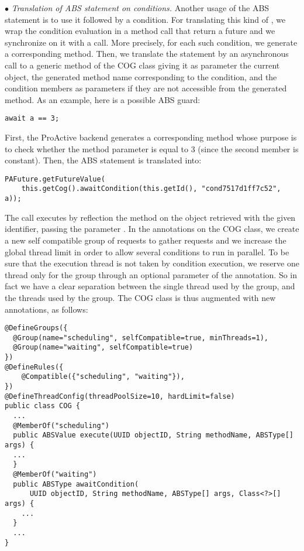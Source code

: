 \smallskip
$\bullet$ \textit{Translation of ABS  statement on conditions.}
Another usage of the ABS  statement is to use it followed by a condition. For translating this kind of , we wrap the condition evaluation in a method call that return a future and we synchronize on it with a  call. More precisely, for each such condition, we generate a corresponding method. Then, we translate the  statement by an asynchronous call to a generic  method of the COG class
giving it as parameter the current object, the generated method name corresponding to the condition, and the condition members as parameters if they are not accessible from the generated method.
As an example, here is a possible ABS guard:
\begin{lstlisting}
await a == 3;
\end{lstlisting}
First, the ProActive backend generates a corresponding method  whose purpose is to check whether the method parameter is equal to 3 (since the second member is constant).
Then, the ABS  statement is translated into:
\begin{lstlisting}
PAFuture.getFutureValue(
    this.getCog().awaitCondition(this.getId(), "cond7517d1ff7c52", a));
\end{lstlisting}
The  call executes by reflection the method  on the object retrieved with the given identifier, passing the parameter .
In the annotations on the COG class, we create a new self compatible group of requests to gather  requests and we increase the global thread limit in order to allow several conditions to run in parallel. To be sure that the execution thread is not taken by condition execution, we reserve one thread only for the  group through an optional parameter of the  annotation.  
So in fact we have a clear separation between the single thread used by the  group, and the threads used by the  group.
The COG class is thus augmented with new annotations, as follows:
	\setlength\abovecaptionskip{0.25mm}
\begin{lstlisting}
@DefineGroups({
  @Group(name="scheduling", selfCompatible=true, minThreads=1),
  @Group(name="waiting", selfCompatible=true)
})
@DefineRules({
    @Compatible({"scheduling", "waiting"}),
})
@DefineThreadConfig(threadPoolSize=10, hardLimit=false)
public class COG {
  ...
  @MemberOf("scheduling")
  public ABSValue execute(UUID objectID, String methodName, ABSType[] args) {
  ...
  }
  @MemberOf("waiting")
  public ABSType awaitCondition(
      UUID objectID, String methodName, ABSType[] args, Class<?>[] args) {
    ...
  }
  ...
}
\end{lstlisting}

